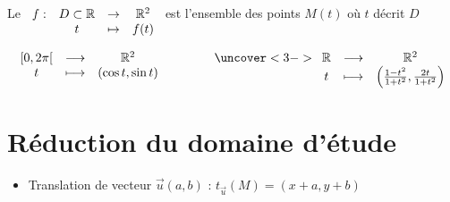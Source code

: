 \begin{frame}

\begin{mydefinition}
Le  $\begin{array}[t]{cccc}
f :&D\subset\mathbb{R}&\rightarrow&\mathbb{R}^2\\
 &t&\mapsto&f(t)
\end{array}$ est l'ensemble des points $M(t)$ où $t$ décrit $D$
\end{mydefinition}

\pause	

$$\begin{array}[t]{ccc}
[0,2\pi[&\longrightarrow&\Rr^2\\
t&\longmapsto&(\cos t,\sin t)
\end{array} \qquad \qquad 
\uncover<3->{
\begin{array}[t]{ccc}
\Rr &\longrightarrow&\Rr^2\\
t&\longmapsto& \left(\frac{1-t^2}{1+t^2},\frac{2t}{1+t^2}\right)
\end{array}
}$$ 

\end{frame}

\section{Réduction du domaine d'étude}

\begin{frame}


\begin{itemize}
  \item Translation de vecteur $\vec{u}(a,b)$ : $t_{\vec{u}}(M)=(x+a,y+b)$
\end{itemize}



\end{frame}


